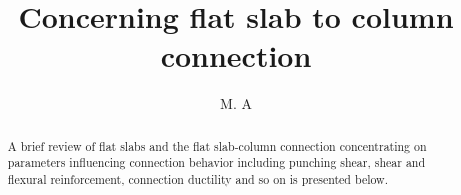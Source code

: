 \documentclass[twocolumn,9pt]{article} %
\title{Concerning flat slab to column connection}
\author{M. A}
\begin{document}
\maketitle
\begin{abstract}
A brief review of flat slabs and the flat slab-column connection concentrating on parameters influencing connection behavior including punching shear, shear and flexural reinforcement, connection ductility and so on is presented below.
\end{abstract}

%
%

%
%
%
%
%
%



%



\end{document}
